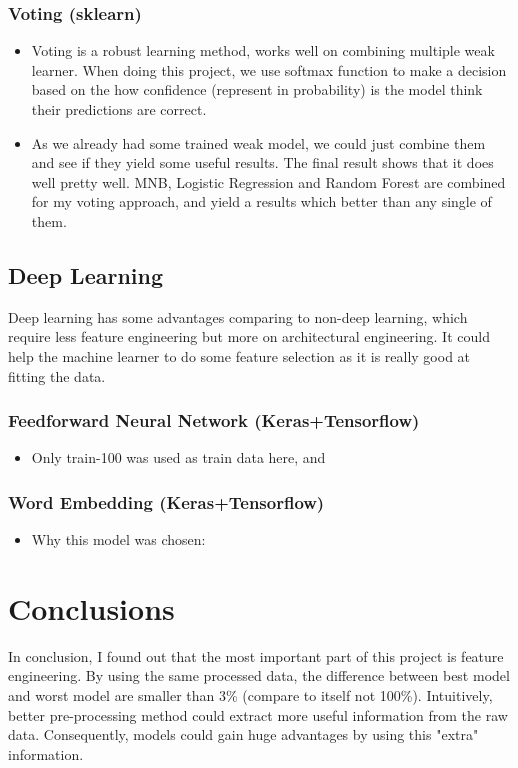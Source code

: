 \documentclass[11pt]{article}
\begin{document}
\subsubsection{Voting (sklearn)}
\begin{itemize}
      \item Voting is a robust learning method, works well on combining
            multiple weak learner. When doing this project, we use softmax function
            to make a decision based on the how confidence (represent in probability) 
            is the model think their predictions are correct.
      \item As we already had some trained weak model, we could just combine them and 
            see if they yield some useful results. The final result shows that it does
            well pretty well. MNB, Logistic Regression and Random Forest are combined 
            for my voting approach, and yield a results which better than any single 
            of them.
            
\end{itemize}

\subsection{Deep Learning}
Deep learning has some advantages comparing to non-deep learning, which require less
feature engineering but more on architectural engineering. It could help the machine 
learner to do some feature selection as it is really good at fitting the data.

\subsubsection{Feedforward Neural Network (Keras+Tensorflow)}
\begin{itemize}
      \item Only train-100 was used as train data here, and 
\end{itemize}

\subsubsection{Word Embedding (Keras+Tensorflow)}
\begin{itemize}
      \item Why this model was chosen:
\end{itemize}


\section{Conclusions}

In conclusion, I found out that the most important part of this project is feature engineering.
By using the same processed data, the difference between best model and worst model are smaller
than 3\% (compare to itself not 100\%). Intuitively, better pre-processing method could extract 
more useful information from the raw data. Consequently, models could gain huge advantages by 
using this "extra" information.



\end{document}
